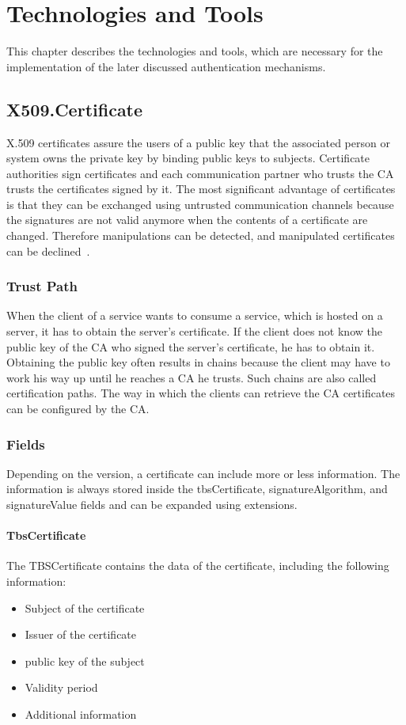 \chapter{Technologies and Tools}
This chapter describes the technologies and tools, which are necessary for the implementation of the later discussed authentication mechanisms.

\section{X509.Certificate}
X.509 certificates assure the users of a public key that the associated person or system owns the private key by binding public keys to subjects.
Certificate authorities sign certificates and each communication partner who trusts the CA trusts the certificates signed by it.
The most significant advantage of certificates is that they can be exchanged using untrusted communication channels because the signatures are not valid anymore when the contents of a certificate are changed.
Therefore manipulations can be detected, and manipulated certificates can be declined~\cite{x509rfc}.

\subsection{Trust Path}
When the client of a service wants to consume a service, which is hosted on a server, it has to obtain the server's certificate.
If the client does not know the public key of the CA who signed the server's certificate, he has to obtain it.
Obtaining the public key often results in chains because the client may have to work his way up until he reaches a CA he trusts.
Such chains are also called certification paths.
The way in which the clients can retrieve the CA certificates can be configured by the CA.

\subsection{Fields}
Depending on the version, a certificate can include more or less information.
The information is always stored inside the tbsCertificate, signatureAlgorithm, and signatureValue fields and can be expanded using extensions.

\subsubsection{TbsCertificate}
The TBSCertificate contains the data of the certificate, including the following information:
\begin{itemize}
    \item Subject of the certificate
    \item Issuer of the certificate
    \item public key of the subject
    \item Validity period
    \item Additional information
\end{itemize}

